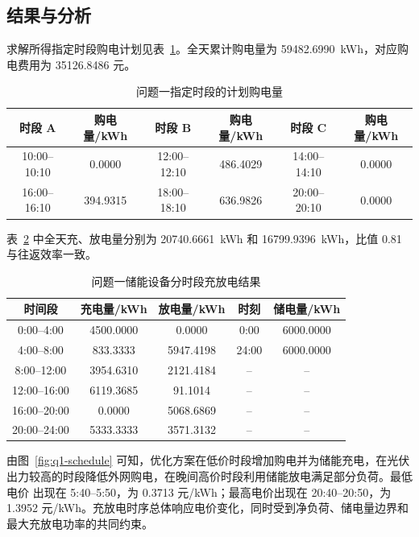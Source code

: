\documentclass[withoutpreface,bwprint]{cumcmthesis}
\begin{document}
\subsection{结果与分析}

求解所得指定时段购电计划见表~\ref{tab:q1-purchase}。全天累计购电量为
\SI{59482.6990}{kWh}，对应购电费用为 \num{35126.8486} 元。

\begin{table}[H]
  \centering
  \caption{问题一指定时段的计划购电量}
  \label{tab:q1-purchase}
  \begin{tabular}{cccccc}
    \toprule
    时段 A & 购电量/kWh & 时段 B & 购电量/kWh & 时段 C & 购电量/kWh \\
    \midrule
    10:00--10:10 & 0.0000 & 12:00--12:10 & 486.4029 & 14:00--14:10 & 0.0000 \\
    16:00--16:10 & 394.9315 & 18:00--18:10 & 636.9826 & 20:00--20:10 & 0.0000 \\
    \bottomrule
  \end{tabular}
\end{table}

表~\ref{tab:q1-storage} 中全天充、放电量分别为 \SI{20740.6661}{kWh} 和
\SI{16799.9396}{kWh}，比值 0.81 与往返效率一致。

\begin{table}[H]
  \centering
  \caption{问题一储能设备分时段充放电结果}
  \label{tab:q1-storage}
  \begin{tabular}{ccccc}
    \toprule
    时间段 & 充电量/kWh & 放电量/kWh & 时刻 & 储电量/kWh \\
    \midrule
    0:00--4:00   & 4500.0000 & 0.0000    & 0:00  & 6000.0000 \\
    4:00--8:00   & 833.3333  & 5947.4198 & 24:00 & 6000.0000 \\
    8:00--12:00  & 3954.6310 & 2121.4184 & -- & -- \\
    12:00--16:00 & 6119.3685 & 91.1014   & -- & -- \\
    16:00--20:00 & 0.0000    & 5068.6869 & -- & -- \\
    20:00--24:00 & 5333.3333 & 3571.3132 & -- & -- \\
    \bottomrule
  \end{tabular}
\end{table}

由图~\ref{fig:q1-schedule} 可知，优化方案在低价时段增加购电并为储能充电，在光伏
出力较高的时段降低外网购电，在晚间高价时段利用储能放电满足部分负荷。最低电价
出现在 5:40--5:50，为 \num{0.3713} 元/kWh；最高电价出现在 20:40--20:50，为
\num{1.3952} 元/kWh。充放电时序总体响应电价变化，同时受到净负荷、储电量边界和
最大充放电功率的共同约束。
\end{document}

